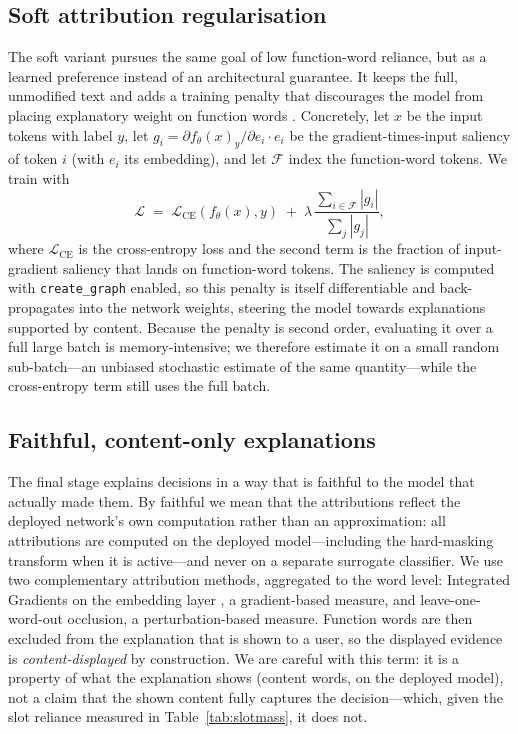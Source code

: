 \documentclass[10pt,twocolumn]{article}
\begin{document}
\subsection{Soft attribution regularisation}
The soft variant pursues the same goal of low function-word reliance, but as a learned preference instead of an architectural guarantee. It keeps the full, unmodified text and adds a training penalty that discourages the model from placing explanatory weight on function words \cite{ross}. Concretely, let $x$ be the input tokens with label $y$, let $g_i = \partial f_\theta(x)_y / \partial e_i \cdot e_i$ be the gradient-times-input saliency of token $i$ (with $e_i$ its embedding), and let $\mathcal{F}$ index the function-word tokens. We train with
\begin{equation}
\mathcal{L} \;=\; \mathcal{L}_{\mathrm{CE}}(f_\theta(x), y) \;+\; \lambda \,\frac{\sum_{i \in \mathcal{F}} |g_i|}{\sum_{j} |g_j|},
\label{eq:softreg}
\end{equation}
where $\mathcal{L}_{\mathrm{CE}}$ is the cross-entropy loss and the second term is the fraction of input-gradient saliency that lands on function-word tokens. The saliency is computed with \texttt{create\_graph} enabled, so this penalty is itself differentiable and back-propagates into the network weights, steering the model towards explanations supported by content. Because the penalty is second order, evaluating it over a full large batch is memory-intensive; we therefore estimate it on a small random sub-batch---an unbiased stochastic estimate of the same quantity---while the cross-entropy term still uses the full batch.
\subsection{Faithful, content-only explanations}
The final stage explains decisions in a way that is faithful to the model that actually made them. By faithful we mean that the attributions reflect the deployed network's own computation rather than an approximation: all attributions are computed on the deployed model---including the hard-masking transform when it is active---and never on a separate surrogate classifier. We use two complementary attribution methods, aggregated to the word level: Integrated Gradients on the embedding layer \cite{ig}, a gradient-based measure, and leave-one-word-out occlusion, a perturbation-based measure. Function words are then excluded from the explanation that is shown to a user, so the displayed evidence is \emph{content-displayed} by construction. We are careful with this term: it is a property of what the explanation shows (content words, on the deployed model), not a claim that the shown content fully captures the decision---which, given the slot reliance measured in Table~\ref{tab:slotmass}, it does not.
\end{document}
